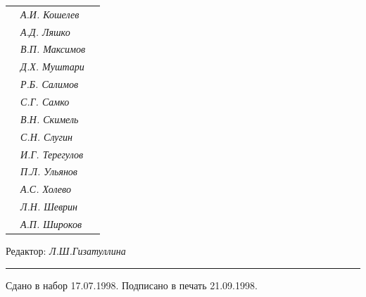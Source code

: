\begin{tabular}{p{63mm}p{40mm}p{50mm}}
                               &   \it А.И. Кошелев  & \\


                               &   \it А.Д. Ляшко  & \\


                               &   \it В.П. Максимов  & \\


                               &   \it Д.Х. Муштари & \\


                               &   \it Р.Б. Салимов  & \\


                               &   \it С.Г. Самко  & \\


                               &   \it В.Н. Скимель &  \\


                               &   \it С.Н. Слугин  & \\


                               &   \it И.Г. Терегулов  & \\


                               &   \it П.Л. Ульянов  & \\


                               &   \it А.С. Холево  & \\


                               &   \it Л.Н. Шеврин  & \\


                               &   \it А.П. Широков & \\


\end{tabular} 


\bigskip 


\bigskip 


\bigskip 





 


\centerline{Редактор: \it Л.Ш.Гизатуллина}


\bigskip 


\hrule 


\setlength{\hoffset}{-23mm}


\bigskip


\noindent Сдано в набор 17.07.1998. Подписано в печать 21.09.1998.


